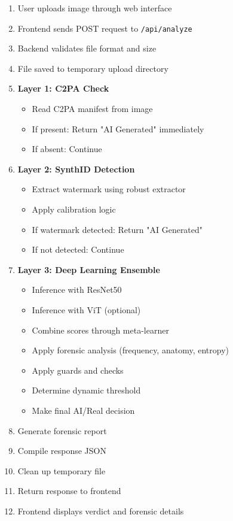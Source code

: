 \documentclass[12pt,a4paper]{book}
\begin{document}
\begin{itemize}
\begin{enumerate}
    \item User uploads image through web interface
    \item Frontend sends POST request to \texttt{/api/analyze}
    \item Backend validates file format and size
    \item File saved to temporary upload directory
    \item \textbf{Layer 1: C2PA Check}
    \begin{itemize}
        \item Read C2PA manifest from image
        \item If present: Return "AI Generated" immediately
        \item If absent: Continue
    \end{itemize}
    \item \textbf{Layer 2: SynthID Detection}
    \begin{itemize}
        \item Extract watermark using robust extractor
        \item Apply calibration logic
        \item If watermark detected: Return "AI Generated"
        \item If not detected: Continue
    \end{itemize}
    \item \textbf{Layer 3: Deep Learning Ensemble}
    \begin{itemize}
        \item Inference with ResNet50
        \item Inference with ViT (optional)
        \item Combine scores through meta-learner
        \item Apply forensic analysis (frequency, anatomy, entropy)
        \item Apply guards and checks
        \item Determine dynamic threshold
        \item Make final AI/Real decision
    \end{itemize}
    \item Generate forensic report
    \item Compile response JSON
    \item Clean up temporary file
    \item Return response to frontend
    \item Frontend displays verdict and forensic details
\end{enumerate}


\end{itemize}
\end{document}
